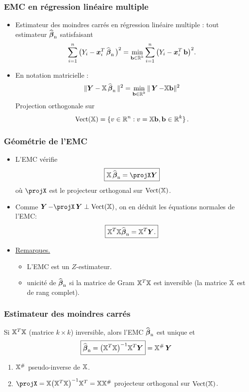 \begin{frame}
\frametitle{EMC en régression linéaire multiple}
\begin{itemize}
\item Estimateur des \alert{moindres carrés} en régression
linéaire multiple : tout estimateur $\operatorname{\widehat{\boldsymbol{\beta}}_n}$ satisfaisant
$$\sum_{i = 1}^n
\big(Y_i- \operatorname{\boldsymbol{x}}_i^T \operatorname{\widehat{\boldsymbol{\beta}}_n} \big)^2 = \min_{\mathbf{b} \in \operatorname{{\mathbb R}}^k}\sum_{i =
1}^n \big(Y_i- \operatorname{\boldsymbol{x}}_i^T \mathbf{b}\big)^2.$$
\item En notation matricielle :
\[
\|\boldsymbol{Y}-\mathbb{X}\operatorname{\widehat{\boldsymbol{\beta}}_n}\|^2 =   \min_{\mathbf{b} \in \operatorname{{\mathbb R}}^k}\|\operatorname{\boldsymbol{Y}} -\mathbb{X}\mathbf{b}\|^2
\]
\alert{Projection orthogonale} sur
$$
\mathrm{Vect}(\mathbb{X}) = \{v\in \operatorname{{\mathbb R}}^n: v=\mathbb{X} \mathbf{b}, \mathbf{b} \in \operatorname{{\mathbb R}}^k\} \,.
$$
\end{itemize}
\end{frame}


 \begin{frame}
\frametitle{Géométrie de l'EMC}
 \begin{itemize}
 \item L'EMC vérifie
$$\boxed{\regressmat \estregress = \projX \boldsymbol{Y}}$$
o\`u $\projX$ est le projecteur orthogonal sur $\mathrm{Vect}(\mathbb{X})$.
\item Comme $ \bY - \projX \bY \perp \vect(\regressmat)$, on en déduit \alert{les équations normales} de l'EMC:
$$\boxed{\mathbb{X}^T\mathbb{X} {\operatorname{\widehat{\boldsymbol{\beta}}_n}} =
\mathbb{X}^T\boldsymbol{Y}.}$$
\item \underline{Remarques.}
  \begin{itemize}
  \item L'EMC est un $Z$-estimateur.
  \item \alert{unicité} de $\operatorname{\widehat{\boldsymbol{\beta}}_n}$ si la matrice de Gram
  $\mathbb{X}^T\mathbb{X}$ est inversible (la matrice $\mathbb{X}$ est de rang complet).
  \end{itemize}
\end{itemize}
\end{frame}

\begin{frame} \frametitle{Estimateur des moindres carrés}
\begin{prop}
Si $\mathbb{X}^T\mathbb{X}$ (matrice $k \times k$) inversible, alors l'EMC
$\operatorname{\widehat{\boldsymbol{\beta}}_n}$ est \alert{unique} et
$$\boxed{\operatorname{\widehat{\boldsymbol{\beta}}_n} = \big(\mathbb{X}^T\mathbb{X}\big)^{-1}\mathbb{X}^T \boldsymbol{Y}}= \mathbb{X}^{\#} \operatorname{\boldsymbol{Y}}$$
\end{prop}
\begin{enumerate}
\item $\mathbb{X}^{\#}$ \alert{pseudo-inverse} de $\mathbb{X}$.
\item $\projX = \regressmat\big(\regressmat^T\regressmat\big)^{-1}\regressmat^T = \regressmat \regressmat^{\#}$
projecteur orthogonal sur $\mathrm{Vect}(\mathbb{X})$.
\end{enumerate}
\end{frame}


